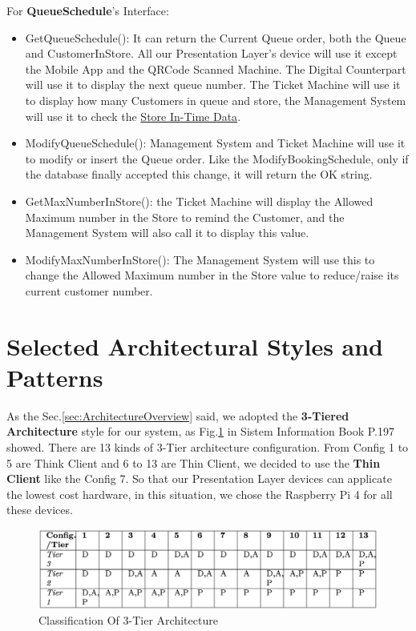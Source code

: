 \documentclass[a4paper,12pt]{report}
\begin{document}
\vspace{5mm}

For \textbf{QueueSchedule}'s Interface:

\begin{itemize}
	\item GetQueueSchedule(): It can return the Current Queue order, both the Queue and CustomerInStore.
	All our Presentation Layer's device will use it except the Mobile App and the QRCode Scanned Machine.
	The Digital Counterpart will use it to display the next queue number.
	The Ticket Machine will use it to display how many Customers in queue and store, the Management System will use it to check the \hyperref[subsec:definitions]{Store In-Time Data}.
	\item ModifyQueueSchedule(): Management System and Ticket Machine will use it to modify or insert the Queue order.
	Like the ModifyBookingSchedule, only if the database finally accepted this change, it will return the OK string.
	\item GetMaxNumberInStore(): the Ticket Machine will display the Allowed Maximum number in the Store to remind the Customer, and the Management System will also call it to display this value.
	\item ModifyMaxNumberInStore(): The Management System will use this to change the Allowed Maximum number in the Store value to reduce/raise its current customer number.
\end{itemize}


\section{Selected Architectural Styles and Patterns}\label{sec:SelectedArchitecturalStylesAndPatterns}

As the Sec.\ref{sec:ArchitectureOverview} said, we adopted the \textbf{3-Tiered Architecture} style for our system, as Fig.\ref{fig:Classification Of 3-Tier Architecture} in Sistem Information Book P.197 \cite{SistemiInformativi} showed.
There are 13 kinds of 3-Tier architecture configuration.
From Config 1 to 5 are Think Client and 6 to 13 are Thin Client, we decided to use the \textbf{Thin Client} like the Config 7.
So that our Presentation Layer devices can applicate the lowest cost hardware, in this situation, we chose the Raspberry Pi 4 for all these devices.


\begin{figure}[H]
\includegraphics[width=\textwidth]{ClassificationOf3-TierArchitecture}
\centering
\caption{Classification Of 3-Tier Architecture}
\label{fig:Classification Of 3-Tier Architecture}
\end{figure}
\end{document}
